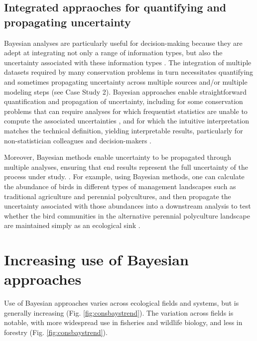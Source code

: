 \documentclass{article}
\begin{document}
\subsection*{Integrated appraoches for quantifying and propagating uncertainty} 
\par Bayesian analyses are particularly useful for decision-making because they are adept at integrating not only a range of information types, but also the uncertainty associated with these information types \citep[e.g.,][]{stern2022interweaving}. The integration of multiple datasets required by many conservation problems in turn necessitates quantifying and sometimes propagating uncertainty across multiple sources and/or multiple modeling steps (see Case Study 2). Bayesian approaches enable straightforward quantification and  propagation of  uncertainty, including for some conservation problems that can require analyses for which frequentist statistics are unable to compute the associated uncertainties \citep{bolker2009a,bates2006r}, and for which the intuitive interpretation matches the technical definition, yielding interpretable results, particularly for non-statistician colleagues and decision-makers \citep{fornacon2021bayesian}. 
\par Moreover, Bayesian methods enable uncertainty to be propagated through multiple analyses, ensuring that end results represent the full uncertainty of the process under study. \citep{draper1995assessment,gilbert2023propagating,Eyster2022,Saunders2019}. For example, using Bayesian methods, one can calculate the abundance of birds in different types of management landscapes such as traditional agriculture and perennial polycultures, and then propagate the uncertainty associated with those abundances into a downstream analysis to test whether the bird communities in the alternative perennial polyculture landscape are maintained simply as an ecological sink \citep{Eyster2022}. 

\section* {Increasing use of Bayesian approaches}
\par Use of Bayesian approaches varies across ecological fields and systems, but is generally increasing (Fig. \ref{fig:consbaystrend}). The variation across fields is notable, with more widespread use in fisheries and wildlife biology, and less in forestry  (Fig. \ref{fig:consbaystrend}).
\end{document}
